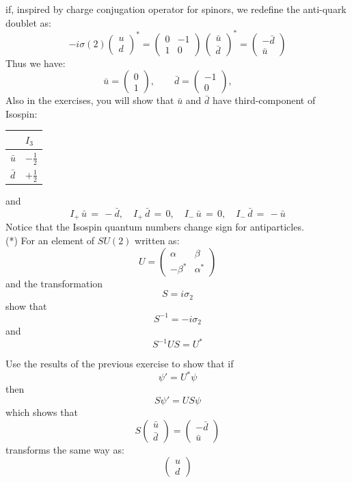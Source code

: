 \documentclass[12pt]{article}
\begin{document}
if, inspired by charge conjugation operator for spinors, we redefine
the anti-quark doublet as:
$$
-i \sigma(2) \begin{pmatrix} u \\ d \end{pmatrix}^*
=
\begin{pmatrix} 0 & -1 \\ 1 & 0 \end{pmatrix} \,
\begin{pmatrix} \bar{u} \\ \bar{d} \end{pmatrix}^*
=
\begin{pmatrix} -\bar{d} \\ \bar{u} \end{pmatrix}
$$
Thus we have:
$$ \bar{u} = \begin{pmatrix} 0 \\  1 \end{pmatrix}, \qquad
\bar{d} = \begin{pmatrix} -1 \\  0 \end{pmatrix}, \qquad
$$
Also in the exercises, you will show that $\bar{u}$ and $\bar{d}$ have third-component of Isospin:\\
\begin{center}
\begin{tabular}{ll}
\hline
  & $I_3$ \\
\hline
$\bar{u}$ & $-\frac{1}{2}$ \\
$\bar{d}$ & $+\frac{1}{2}$ \\
\hline
\end{tabular}
\end{center}
and
\begin{equation}
  \label{eqn:isospin-antiparticles}
  I_+ \, \bar{u} \, = \, -\bar{d}, \quad I_+ \, \bar{d} \, = \, 0, \quad
  I_- \, \bar{u} \, = \, 0, \quad I_- \, \bar{d} \, = \, -\bar{u} 
\end{equation}
Notice that the Isospin quantum numbers change sign for antiparticles.\\[5pt]

\exercise (*) For an element of $SU(2)$ written as:
$$U = \begin{pmatrix} \alpha & \beta \\ -\beta^* & \alpha^* \end{pmatrix}$$
and the transformation
$$S = i \sigma_2$$
show that
$$S^{-1} = -i \sigma_2$$
and
$$S^{-1} U S = U^*$$


\exercise Use the results of the previous exercise to show that if
$$\psi' = U^* \psi$$
then
$$S \psi' = U S \psi$$
which shows that
$$S \begin{pmatrix} \bar{u} \\ \bar{d} \end{pmatrix}
= \begin{pmatrix} -\bar{d} \\ \bar{u} \end{pmatrix}
$$
transforms the same way as:
$$\begin{pmatrix} u \\ d \end{pmatrix}$$
\end{document}
